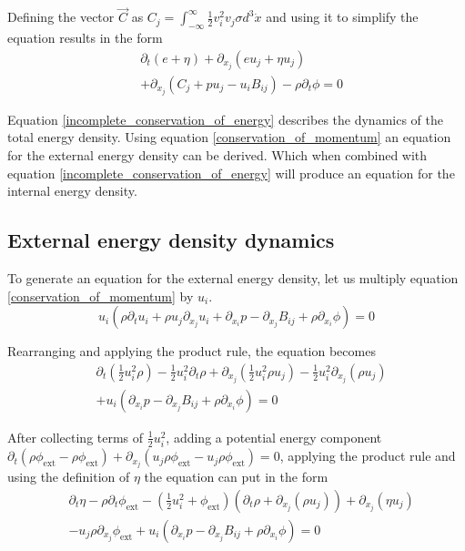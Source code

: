 \documentclass[%
 reprint,
 amsmath,amssymb,
 aps,
]{revtex4-1}
\newcommand{\intVdot}[1]{\int_{-\infty}^{\infty} #1 d^3\dot{x}}
\begin{document}
Defining the vector $\vec{C}$ as $C_j = \intVdot{\frac{1}{2}v_i^2 v_j\sigma}$ and using it to simplify the equation results in the form
\begin{equation}
\begin{split}
& \partial_t\left(e + \eta\right) + \partial_{x_j}\left(e u_j + \eta u_j\right) \\ & + \partial_{x_j}\left(C_j + p u_j - u_i B_{ij}\right) - \rho\partial_t\phi=0
\end{split}
\label{incomplete_conservation_of_energy}
\end{equation}

Equation \eqref{incomplete_conservation_of_energy} describes the dynamics of the total energy density. Using equation \eqref{conservation_of_momentum} an equation for the external energy density can be derived. Which when combined with equation \eqref{incomplete_conservation_of_energy} will produce an equation for the internal energy density.

\subsection{External energy density dynamics}
To generate an equation for the external energy density, let us multiply equation \eqref{conservation_of_momentum} by $u_i$.
\[
u_i\left(\rho\partial_t u_i + \rho u_j\partial_{x_j}u_i + \partial_{x_i}p - \partial_{x_j}B_{ij} + \rho\partial_{x_i}\phi\right)=0
\]

Rearranging and applying the product rule, the equation becomes
\[
\begin{split}
& \partial_t\left(\frac{1}{2}u_i^2\rho\right) - \frac{1}{2}u_i^2\partial_t\rho + \partial_{x_j}\left(\frac{1}{2}u_i^2\rho u_j\right) - \frac{1}{2}u_i^2\partial_{x_j}\left(\rho u_j\right) \\ & + u_i\left(\partial_{x_i}p - \partial_{x_j}B_{ij} + \rho\partial_{x_i}\phi\right)=0
\end{split}
\]

After collecting terms of $\frac{1}{2}u_i^2$, adding a potential energy component $\partial_t\left(\rho\phi_{\text{ext}} - \rho\phi_{\text{ext}}\right) + \partial_{x_j}\left(u_j\rho\phi_{\text{ext}} - u_j\rho\phi_{\text{ext}}\right)=0$, applying the product rule and using the definition of $\eta$ the equation can put in the form
\[
\begin{split}
& \partial_t\eta - \rho\partial_t\phi_{\text{ext}} - \left(\frac{1}{2}u_i^2 + \phi_{\text{ext}}\right)\left(\partial_t\rho + \partial_{x_j}\left(\rho u_j\right)\right)+ \partial_{x_j}\left(\eta u_j\right) \\ & - u_j\rho\partial_{x_j}\phi_{\text{ext}} + u_i\left(\partial_{x_i}p - \partial_{x_j}B_{ij} + \rho\partial_{x_i}\phi\right)=0
\end{split}
\]
\end{document}
